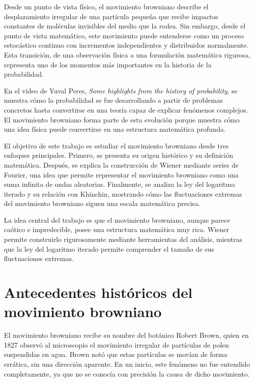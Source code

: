 \documentclass[12pt]{article}
\begin{document}
Desde un punto de vista físico, el movimiento browniano describe el desplazamiento irregular de una partícula pequeña que recibe impactos constantes de moléculas invisibles del medio que la rodea. Sin embargo, desde el punto de vista matemático, este movimiento puede entenderse como un proceso estocástico continuo con incrementos independientes y distribuidos normalmente. Esta transición, de una observación física a una formulación matemática rigurosa, representa uno de los momentos más importantes en la historia de la probabilidad.

En el video de Yuval Peres, \textit{Some highlights from the history of probability}, se muestra cómo la probabilidad se fue desarrollando a partir de problemas concretos hasta convertirse en una teoría capaz de explicar fenómenos complejos. El movimiento browniano forma parte de esta evolución porque muestra cómo una idea física puede convertirse en una estructura matemática profunda.

El objetivo de este trabajo es estudiar el movimiento browniano desde tres enfoques principales. Primero, se presenta su origen histórico y su definición matemática. Después, se explica la construcción de Wiener mediante series de Fourier, una idea que permite representar el movimiento browniano como una suma infinita de ondas aleatorias. Finalmente, se analiza la ley del logaritmo iterado y su relación con Khinchin, mostrando cómo las fluctuaciones extremas del movimiento browniano siguen una escala matemática precisa.

La idea central del trabajo es que el movimiento browniano, aunque parece caótico e impredecible, posee una estructura matemática muy rica. Wiener permite construirlo rigurosamente mediante herramientas del análisis, mientras que la ley del logaritmo iterado permite comprender el tamaño de sus fluctuaciones extremas.

\section{Antecedentes históricos del movimiento browniano}

El movimiento browniano recibe su nombre del botánico Robert Brown, quien en 1827 observó al microscopio el movimiento irregular de partículas de polen suspendidas en agua. Brown notó que estas partículas se movían de forma errática, sin una dirección aparente. En un inicio, este fenómeno no fue entendido completamente, ya que no se conocía con precisión la causa de dicho movimiento.
\end{document}

